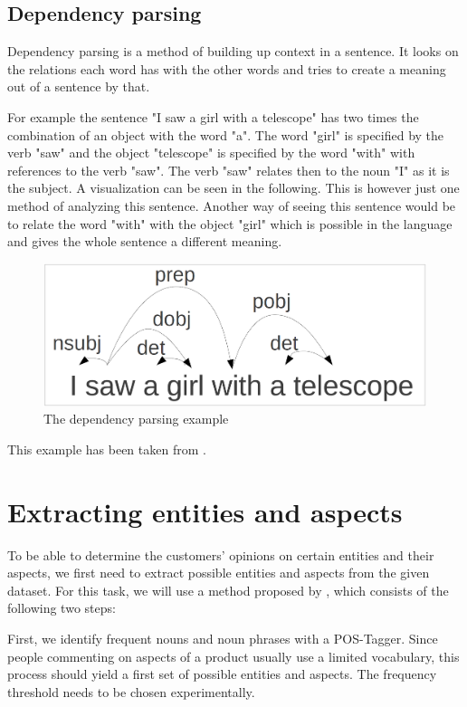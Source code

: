 \documentclass[10pt,a4paper]{article}
\begin{document}
		\subsection{Dependency parsing}
		
		Dependency parsing is a method of building up context in a sentence.
		It looks on the relations each word has with the other words and tries to create a meaning out of a sentence by that.
		
		For example the sentence "I saw a girl with a telescope" has two times the combination of an object with the word "a". 
		The word "girl" is specified by the verb "saw" and the object "telescope" is specified by the word "with" with references to the verb "saw". 
		The verb "saw" relates then to the noun "I" as it is the subject. 		
		A visualization can be seen in the following.
		This is however just one method of analyzing this sentence.
		Another way of seeing this sentence would be to relate the word "with" with the object "girl" which is possible in the language and gives the whole sentence a different meaning.
		
		\begin{figure}[h]
			\centering
			\includegraphics[width=0.8\linewidth]{data/dependency}
			\caption{The dependency parsing example}
			\label{fig:dependency}
		\end{figure}
		
		This example has been taken from \cite{dependency}.
	
	\section{Extracting entities and aspects}
	\label{sec:extraction}
	To be able to determine the customers' opinions on certain entities and their aspects, we first need to extract possible entities and aspects from the given dataset. For this task, we will use a method proposed by \cite{Hu:2004:MSC:1014052.1014073}, which consists of the following two steps:
	
	First, we identify frequent nouns and noun phrases with a POS-Tagger. Since people commenting on aspects of a product usually use a limited vocabulary, this process should yield a first set of possible entities and aspects. The frequency threshold needs to be chosen experimentally.
	
\end{document}
